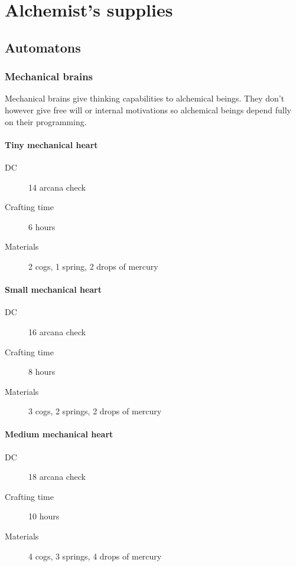 \chapter{Alchemist's supplies}

\section{Automatons}

\subsection{Mechanical brains}

Mechanical brains give thinking capabilities to alchemical beings. They don't however give free will or internal motivations so alchemical beings
depend fully on their programming.

\subsubsection{Tiny mechanical heart}

\begin{description}
\item [DC] 14 arcana check
\item [Crafting time] 6 hours
\item [Materials] 2 cogs, 1 spring, 2 drops of mercury
\end{description}

\subsubsection{Small mechanical heart}

\begin{description}
\item [DC] 16 arcana check
\item [Crafting time] 8 hours
\item [Materials] 3 cogs, 2 springs, 2 drops of mercury
\end{description}

\subsubsection{Medium mechanical heart}

\begin{description}
\item [DC] 18 arcana check
\item [Crafting time] 10 hours
\item [Materials] 4 cogs, 3 springs, 4 drops of mercury
\end{description}


